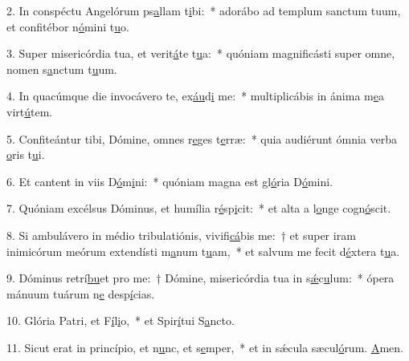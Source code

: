 2. In conspéctu Angelórum ps\uline{a}llam t\uline{i}bi:~* adorábo ad templum sanctum tuum, et confitébor n\uline{ó}mini t\uline{u}o.\par 
3. Super misericórdia tua, et verit\uline{á}te t\uline{u}a:~* quóniam magnificásti super omne, nomen s\uline{a}nctum t\uline{u}um.\par 
4. In quacúmque die invocávero te, ex\uline{áu}d\uline{i} me:~* multiplicábis in ánima m\uline{e}a virt\uline{ú}tem.\par 
5. Confiteántur tibi, Dómine, omnes r\uline{e}ges t\uline{e}rræ:~* quia audiérunt ómnia verba \uline{o}ris t\uline{u}i.\par 
6. Et cantent in viis D\uline{ó}m\uline{i}ni:~* quóniam magna est gl\uline{ó}ria D\uline{ó}mini.\par 
7. Quóniam excélsus Dóminus, et humília r\uline{é}sp\uline{i}cit:~* et alta a l\uline{o}nge cogn\uline{ó}scit.\par 
8. Si ambulávero in médio tribulatiónis, vivifi\uline{cá}bis me:~† et super iram inimicórum meórum extendísti m\uline{a}num t\uline{u}am,~* et salvum me fecit d\uline{é}xtera t\uline{u}a.\par 
9. Dóminus retrí\uline{bu}et pro me:~† Dómine, misericórdia tua in s\uline{ǽ}c\uline{u}lum:~* ópera mánuum tuárum n\uline{e} desp\uline{í}cias.\par 
10. Glória Patri, et F\uline{í}l\uline{i}o,~* et Spir\uline{í}tui S\uline{a}ncto.\par 
11. Sicut erat in princípio, et n\uline{u}nc, et s\uline{e}mper,~* et in sǽcula sæcul\uline{ó}rum. \uline{A}men.\par 
